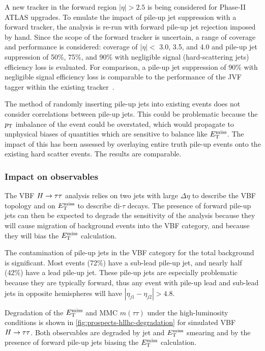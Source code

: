 A new tracker in the forward region $|\eta| > 2.5$ is being considered for Phase-II ATLAS upgrades. To emulate the impact of pile-up jet suppression with a forward tracker, the analysis is re-run with forward pile-up jet rejection imposed by hand. Since the scope of the forward tracker is uncertain, a range of coverage and performance is considered: coverage of $|\eta| < $ 3.0, 3.5, and 4.0 and pile-up jet suppression of 50\%, 75\%, and 90\% with negligible signal (hard-scattering jets) efficiency loss is evaluated. For comparison, a pile-up jet suppression of 90\% with negligible signal efficiency loss is comparable to the performance of the JVF tagger within the existing tracker~\cite{ATLAS-CONF-2014-018}.

The method of randomly inserting pile-up jets into existing events does not consider correlations between pile-up jets. This could be problematic because the $p_{\mathrm{T}}$ imbalance of the event could be overstated, which would propagate to unphysical biases of quantities which are sensitive to balance like $E_{\mathrm{T}}^{\mathrm{miss}}$. The impact of this has been assessed by overlaying entire truth pile-up events onto the existing hard scatter events. The results are comparable.

\subsubsection{Impact on observables}

The VBF $H\rightarrow\tau\tau$ analysis relies on two jets with large $\Delta\eta$ to describe the VBF topology and on $E_{\mathrm{T}}^{\mathrm{miss}}$ to describe di-$\tau$ decays. The presence of forward pile-up jets can then be expected to degrade the sensitivity of the analysis because they will cause migration of background events into the VBF category, and because they will bias the $E_{\mathrm{T}}^{\mathrm{miss}}$ calculation.

The contamination of pile-up jets in the VBF category for the total background is significant. Most events (72\%) have a sub-lead pile-up jet, and nearly half (42\%) have a lead pile-up jet. These pile-up jets are especially problematic because they are typically forward, thus any event with pile-up lead and sub-lead jets in opposite hemispheres will have $|\eta_{j1} - \eta_{j2}| > 4.8$.

Degradation of the $E_{\mathrm{T}}^{\mathrm{miss}}$ and MMC $m(\tau\tau)$ under the high-luminosity conditions is shown in \cref{fig:prospects-hllhc-degradation} for simulated VBF $H\rightarrow\tau\tau$. Both observables are degraded by jet and $E_{\mathrm{T}}^{\mathrm{miss}}$ smearing and by the presence of forward pile-up jets biasing the $E_{\mathrm{T}}^{\mathrm{miss}}$ calculation.

